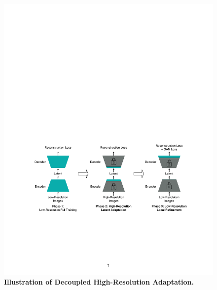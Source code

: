 \begin{figure}[t]
    \centering
    \includegraphics[width=0.95\linewidth]{figures/src/method_training_pipeline.pdf}
    \caption{\textbf{Illustration of Decoupled High-Resolution Adaptation.}}
    \label{fig:method_training_pipeline}
\end{figure}